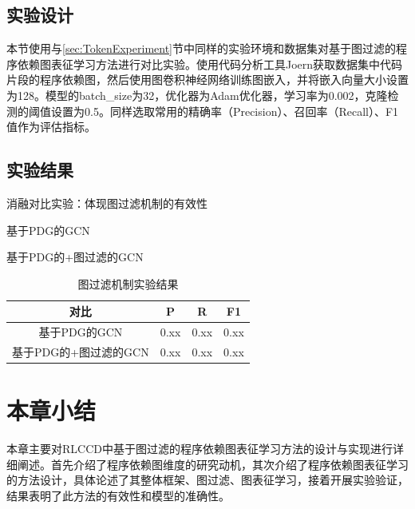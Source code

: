 \subsection{实验设计}
\label{sec:PDGDesign}
本节使用与\ref{sec:TokenExperiment}节中同样的实验环境和数据集对基于图过滤的程序依赖图表征学习方法进行对比实验。使用代码分析工具Joern获取数据集中代码片段的程序依赖图，然后使用图卷积神经网络训练图嵌入，并将嵌入向量大小设置为128。模型的batch\_size为32，优化器为Adam优化器，学习率为0.002，克隆检测的阈值设置为0.5。同样选取常用的精确率（Precision）、召回率（Recall）、F1值作为评估指标。

\subsection{实验结果}
\label{subsec:PDGResult}
消融对比实验：体现图过滤机制的有效性

基于PDG的GCN

基于PDG的+图过滤的GCN


\begin{table}
  \centering
  \caption{图过滤机制实验结果} %
  \begin{tabular*}{0.9\textwidth}{@{\extracolsep{\fill}}cccc}
  \toprule
    对比			&P		&R		&F1 \\
  \midrule
    基于PDG的GCN			&0.xx	&0.xx		&0.xx \\
    基于PDG的+图过滤的GCN			&0.xx		&0.xx		&0.xx \\
  \bottomrule
  \end{tabular*}
\end{table}

\section{本章小结}
\label{sec:Summary5}
本章主要对RLCCD中基于图过滤的程序依赖图表征学习方法的设计与实现进行详细阐述。首先介绍了程序依赖图维度的研究动机，其次介绍了程序依赖图表征学习的方法设计，具体论述了其整体框架、图过滤、图表征学习，接着开展实验验证，结果表明了此方法的有效性和模型的准确性。



